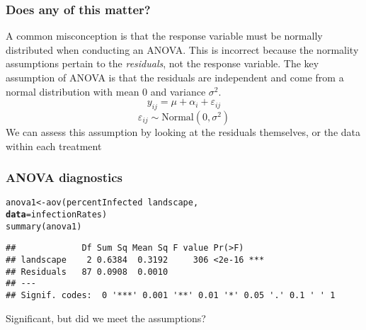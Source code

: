 \documentclass[color=usenames,dvipsnames]{beamer}\usepackage[]{graphicx}\usepackage[]{color}
\makeatletter
\newcommand{\hlopt}[1]{\textcolor[rgb]{0,0,0}{#1}}%
\newcommand{\hlstd}[1]{\textcolor[rgb]{0,0,0}{#1}}%
\newcommand{\hlkwb}[1]{\textcolor[rgb]{0,0.341,0.682}{#1}}%
\newcommand{\hlkwc}[1]{\textcolor[rgb]{0,0,0}{\textbf{#1}}}%
\newcommand{\hlkwd}[1]{\textcolor[rgb]{0.004,0.004,0.506}{#1}}%
\newenvironment{kframe}{%
 \def\at@end@of@kframe{}%
 \ifinner\ifhmode%
  \def\at@end@of@kframe{\end{minipage}}%
  \begin{minipage}{\columnwidth}%
 \fi\fi%
 \def\FrameCommand##1{\hskip\@totalleftmargin \hskip-\fboxsep
 \colorbox{shadecolor}{##1}\hskip-\fboxsep
     \hskip-\linewidth \hskip-\@totalleftmargin \hskip\columnwidth}%
 \MakeFramed {\advance\hsize-\width
   \@totalleftmargin\z@ \linewidth\hsize
   \@setminipage}}%
 {\par\unskip\endMakeFramed%
 \at@end@of@kframe}
\newenvironment{knitrout}{}{} %
\makeatother
\begin{document}




\begin{frame}
  \frametitle{Does any of this matter?}
  {%
    A common misconception is that the response variable must be
    normally distributed when conducting an ANOVA.}
  \pause
  \vfill
  {%
    This is incorrect because the normality assumptions pertain to
    the {\it residuals}, \alert{not} the response variable. The key assumption of
    ANOVA is that the residuals are independent and come from a normal
    distribution with mean 0 and variance $\sigma^2$.}
  \pause
  \large
\[
  y_{ij} = \mu + \alpha_i + \varepsilon_{ij}
\]
\[
  \varepsilon_{ij} \sim \text{Normal}(0, \sigma^2)
\]
\pause
\vfill
\normalsize
  {%
    We can assess this assumption by looking at the residuals
    themselves, or the data within each treatment}
\end{frame}






\begin{frame}[fragile]
  \frametitle{ANOVA diagnostics}
\begin{knitrout}\small
{}\color{fgcolor}\begin{kframe}
\begin{alltt}
\hlstd{anova1} \hlkwb{<-} \hlkwd{aov}\hlstd{(percentInfected} \hlopt{~} \hlstd{landscape,}
              \hlkwc{data}\hlstd{=infectionRates)}
\hlkwd{summary}\hlstd{(anova1)}
\end{alltt}
\begin{verbatim}
##             Df Sum Sq Mean Sq F value Pr(>F)    
## landscape    2 0.6384  0.3192     306 <2e-16 ***
## Residuals   87 0.0908  0.0010                   
## ---
## Signif. codes:  0 '***' 0.001 '**' 0.01 '*' 0.05 '.' 0.1 ' ' 1
\end{verbatim}
\end{kframe}
\end{knitrout}
\pause
\vfill
Significant, but did we meet the assumptions?
\end{frame}
\end{document}
